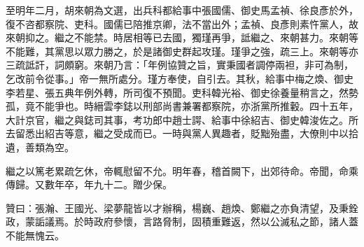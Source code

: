 \begin{pinyinscope}
至明年二月，胡來朝為文選，出兵科都給事中張國儒、御史馬孟禎、徐良彥於外，復不咨都察院、吏科。國儒已陪推京卿，法不當出外；孟禎、良彥則素忤黨人，故來朝抑之。繼之不能禁。時居相等已去國，獨瑾再爭，詆繼之、來朝甚力。來朝等不能難，其黨思以眾力勝之，於是諸御史群起攻瑾。瑾爭之強，疏三上。來朝等亦三疏詆訐，詞頗窮。來朝乃言：「年例協贊之旨，實秉國者調停兩袒，非可為制，乞改前令從事。」帝一無所處分。瑾方奉使，自引去。其秋，給事中梅之煥、御史李若星、張五典年例外轉，所司復不預聞。吏科韓光裕、御史徐養量稍言之，然勢孤，竟不能爭也。時縉雲李鋕以刑部尚書兼署都察院，亦浙黨所推轂。四十五年，大計京官，繼之與鋕司其事，考功郎中趙士諤、給事中徐紹吉、御史韓浚佐之。所去留悉出紹吉等意，繼之受成而已。一時與黨人異趣者，貶黜殆盡，大僚則中以拾遺，善類為空。

繼之以篤老累疏乞休，帝輒慰留不允。明年春，稽首闕下，出郊待命。帝聞，命乘傳歸。又數年卒，年九十二。贈少保。

贊曰：張瀚、王國光、梁夢龍皆以才辦稱，楊巍、趙煥、鄭繼之亦負清望，及秉銓政，蒙詬議焉。於時政府參懷，言路脅制，固積重難返，然以公滅私之節，諸人蓋不能無愧云。


\end{pinyinscope}